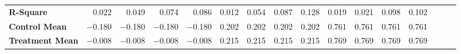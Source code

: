 \begin{tabular}{@{\extracolsep{5pt}}lrrrrrrrrrrrrrrr}
{\bf R-Square} & 0.022\phantom{***} & 0.049\phantom{***} & 0.074\phantom{***} & 0.086\phantom{***} & 0.012\phantom{***} & 0.054\phantom{***} & 0.087\phantom{***} & 0.128\phantom{***} & 0.019\phantom{***} & 0.021\phantom{***} & 0.098\phantom{***} & 0.102\phantom{***} \\
{\bf Control Mean} & $-$0.180\phantom{***} & $-$0.180\phantom{***} & $-$0.180\phantom{***} & $-$0.180\phantom{***} & 0.202\phantom{***} & 0.202\phantom{***} & 0.202\phantom{***} & 0.202\phantom{***} & 0.761\phantom{***} & 0.761\phantom{***} & 0.761\phantom{***} & 0.761\phantom{***} \\
{\bf Treatment Mean} & $-$0.008\phantom{***} & $-$0.008\phantom{***} & $-$0.008\phantom{***} & $-$0.008\phantom{***} & 0.215\phantom{***} & 0.215\phantom{***} & 0.215\phantom{***} & 0.215\phantom{***} & 0.769\phantom{***} & 0.769\phantom{***} & 0.769\phantom{***} & 0.769\phantom{***} \\
\hline
\end{tabular}
